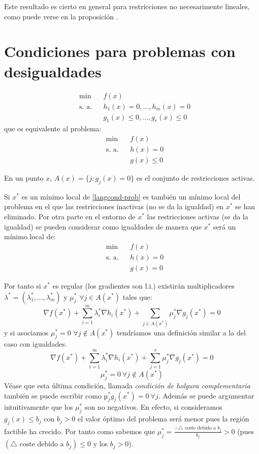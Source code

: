 \documentclass[PM.tex]{subfiles}
\begin{document}
	Este resultado es cierto en general para restricciones no necesarimente lineales, como puede verse en la proposición .

	\section{Condiciones para problemas con desigualdades}
	\[\begin{aligned}
	& \min
	& & f(x) \\
	& \text{s. a.}
	& & h_1(x) = 0,\dots,h_m(x) = 0\\
	& & & g_1(x) ≤ 0, \dots, g_r(x) ≤ 0
	\end{aligned}\]
	que es equivalente al problema:
	\begin{equation}\label{langcond-prob}\begin{aligned}
	& \min
	& & f(x) \\
	& \text{s. a.}
	& & h(x) = 0\\
	& & & g(x) ≤ 0
	\end{aligned}\end{equation}
	
	En un punto $x$, $A(x) = \{j : g_j (x) = 0\}$ es el conjunto de restricciones activas.
	
	Si $x^*$ es un mínimo local de \eqref{langcond-prob} es también un mínimo local del problema en el que las restricciones inactivas (no se da la igualdad) en $x^*$ se han eliminado. Por otra parte en el entorno de $x^*$ las restricciones activas (se da la igualdad) se pueden considerar como igualdades de manera que $x^*$ será un mínimo local de:
	\begin{equation}\label{langcond-prob2}\begin{aligned}
	& \min
	& & f(x) \\
	& \text{s. a.}
	& & h(x) = 0\\
	& & & g(x) = 0
	\end{aligned}\end{equation}
	
Por tanto si $x^*$ es regular (los gradientes son l.i.) existirán  multiplicadores $λ^* = (λ^*_1,\dots,λ^*_m)$ y $μ^*_j$ $\forall j \in A(x^*)$ tales que:
\[ \nabla f(x^*) + \sum_{i=1}^m λ^*_i \nabla h_i(x^*) + \sum_{j \in A(x^*)} μ^*_j \nabla g_j(x^*) = 0 \]
y si asociamos $μ^*_j = 0$ $\forall j \notin A(x^*)$ tendríamos una definición similar a la del caso con igualdades.
\[ \nabla f(x^*) + \sum_{i=1}^m λ^*_i \nabla h_i(x^*) + \sum_{j=1}^r μ^*_j \nabla g_j(x^*) = 0 \]
\[ μ^*_j = 0 \ \forall j \notin A(x^*) \]
Véase que esta última condición, llamada \emph{condición de holgura complementaria} también se puede escribir como $µ^*_jg_j(x^*) = 0\ \forall j$.
Además se puede argumentar intuitivamente que los $μ^*_j$ son no negativos. En efecto, si consideramos $g_j(x) ≤ b_j$ con $b_j > 0$ el valor óptimo del problema será menor pues la región factible ha crecido. Por tanto como sabemos que $μ^*_j = \frac{-\triangle \text{ coste debido a }b_j}{b_j} > 0$ (pues $(\triangle\text{ coste debido a }b_j) ≤ 0$ y los $b_j > 0$).
\end{document}
